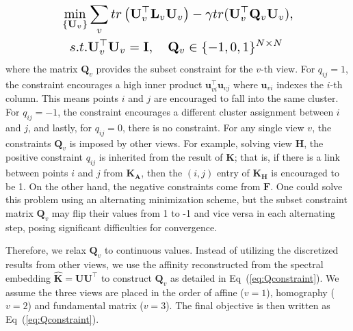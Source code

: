 \documentclass[10pt,twocolumn,letterpaper]{article}
\newcommand{\vect}[1]{\mathbf{#1}}
\newcommand{\matr}[1]{\mathbf{#1}}
\begin{document}
\begin{equation}
\resizebox{.7\hsize}{!}
{$
\begin{split}
\min_{\{\matr{U}_v\}} &\sum_v tr\left(\matr{U}_v^\top\matr{L}_v\matr{U}_v\right) - \gamma tr(\matr{U}_v^\top\matr{Q}_v\matr{U}_v),\\ 
s.t. &\matr{U}_v^\top\matr{U}_v=\matr{I},\quad \matr{Q}_v\in \{-1,0,1\}^{N\times N}\\
\end{split}
$}
\end{equation}
\noindent
where the matrix $\matr{Q}_v$ provides the subset constraint for the $v$-th view. For $q_{ij}=1$, the constraint encourages a high inner product $\vect{u}_{vi}^\top\vect{u}_{vj}$ where $\vect{u}_{vi}$ indexes the $i$-th column. This means points $i$ and $j$ are encouraged to fall into the same cluster. For $q_{ij}=-1$, the constraint encourages a different cluster assignment between $i$ and $j$, and lastly, for $q_{ij}=0$, there is no constraint. For any single view $v$, the constraints $\matr{Q}_v$ is imposed by other views. For example, solving view $\matr{H}$, the positive constraint $q_{ij}$ is inherited from the result of $\matr{K}$; that is, if there is a link between points $i$ and $j$ from $\matr{K_A}$, then the $(i,j)$ entry of $\matr{K_H}$ is encouraged to be 1. On the other hand, the negative constraints come from $\matr{F}$. One could solve this problem using an alternating minimization scheme, but the subset constraint matrix $\matr{Q}_v$ may flip their values from 1 to -1 and vice versa in each alternating step, posing significant difficulties for convergence.

Therefore, we relax $\matr{Q}_v$ to continuous values. Instead of utilizing the discretized results from other views, we use the affinity reconstructed from the spectral embedding $\matr{\hat{K}}=\matr{U}\matr{U}^\top$ to construct $\matr{Q}_v$ as detailed in Eq~(\ref{eq:Qconstraint}). We assume the three views are placed in the order of affine ($v=1$), homography ($v=2$) and fundamental matrix ($v=3$). The final objective is then written as Eq~(\ref{eq:Qconstraint}).
\end{document}
